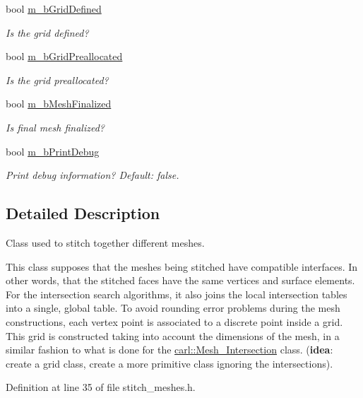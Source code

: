 \begin{DoxyCompactItemize}
bool \hyperlink{classcarl_1_1_stitch___meshes_a9bc08080ddc1f39ee4456aff9eeca725}{m\+\_\+b\+Grid\+Defined}
\begin{DoxyCompactList}\small\item\em Is the grid defined? \end{DoxyCompactList}\item 
bool \hyperlink{classcarl_1_1_stitch___meshes_aa21268c25f5ca61baeed4744b053e2b6}{m\+\_\+b\+Grid\+Preallocated}
\begin{DoxyCompactList}\small\item\em Is the grid preallocated? \end{DoxyCompactList}\item 
bool \hyperlink{classcarl_1_1_stitch___meshes_afbfd4f177dca665f8c50e9694b0f78cd}{m\+\_\+b\+Mesh\+Finalized}
\begin{DoxyCompactList}\small\item\em Is final mesh finalized? \end{DoxyCompactList}\item 
bool \hyperlink{classcarl_1_1_stitch___meshes_aeb94b2d2b28624414fd00e02ec9a97e0}{m\+\_\+b\+Print\+Debug}
\begin{DoxyCompactList}\small\item\em Print debug information? {\itshape Default\+:} false. \end{DoxyCompactList}\end{DoxyCompactItemize}


\subsection{Detailed Description}
Class used to stitch together different meshes. 

This class supposes that the meshes being stitched have compatible interfaces. In other words, that the stitched faces have the same vertices and surface elements. For the intersection search algorithms, it also joins the local intersection tables into a single, global table. To avoid rounding error problems during the mesh constructions, each vertex point is associated to a discrete point inside a grid. This grid is constructed taking into account the dimensions of the mesh, in a similar fashion to what is done for the \hyperlink{classcarl_1_1_mesh___intersection}{carl\+::\+Mesh\+\_\+\+Intersection} class. ({\bfseries idea}\+: create a grid class, create a more primitive class ignoring the intersections). 

Definition at line 35 of file stitch\+\_\+meshes.\+h.



